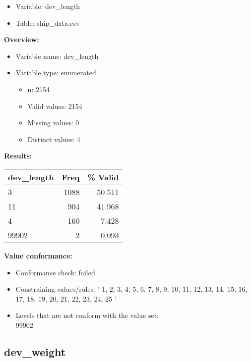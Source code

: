 \documentclass[
]{article}
\providecommand{\tightlist}{%
  \setlength{\itemsep}{0pt}\setlength{\parskip}{0pt}}
\begin{document}
\begin{itemize}
\tightlist
\item
  Variable: dev\_length
\item
  Table: ship\_data.csv
\end{itemize}

\textbf{Overview:}

\begin{itemize}
\tightlist
\item
  Variable name: dev\_length
\item
  Variable type: enumerated

  \begin{itemize}
  \tightlist
  \item
    n: 2154
  \item
    Valid values: 2154
  \item
    Missing values: 0
  \item
    Distinct values: 4
  \end{itemize}
\end{itemize}

\textbf{Results:}\\

\begin{table}[H]
\centering
\begin{tabular}{l|r|r}
\hline
\textbf{dev\_length} & \textbf{Freq} & \textbf{\% Valid}\\
\hline
3 & 1088 & 50.511\\
\hline
11 & 904 & 41.968\\
\hline
4 & 160 & 7.428\\
\hline
99902 & 2 & 0.093\\
\hline
\end{tabular}
\end{table}

\textbf{Value conformance:}

\begin{itemize}
\tightlist
\item
  Conformance check: failed
\item
  Constraining values/rules: ' 1, 2, 3, 4, 5, 6, 7, 8, 9, 10, 11, 12,
  13, 14, 15, 16, 17, 18, 19, 20, 21, 22, 23, 24, 25 '
\item
  Levels that are not conform with the value set:\\
  99902
\end{itemize}

\newpage

\hypertarget{dev_weight}{%
\subsection{dev\_weight}\label{dev_weight}}
\end{document}
